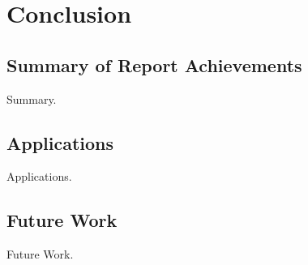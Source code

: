 
\chapter{Conclusion}
\label{ch:conclusions}

\section{Summary of Report Achievements}

Summary.


\section{Applications}

Applications.


\section{Future Work}

Future Work.

